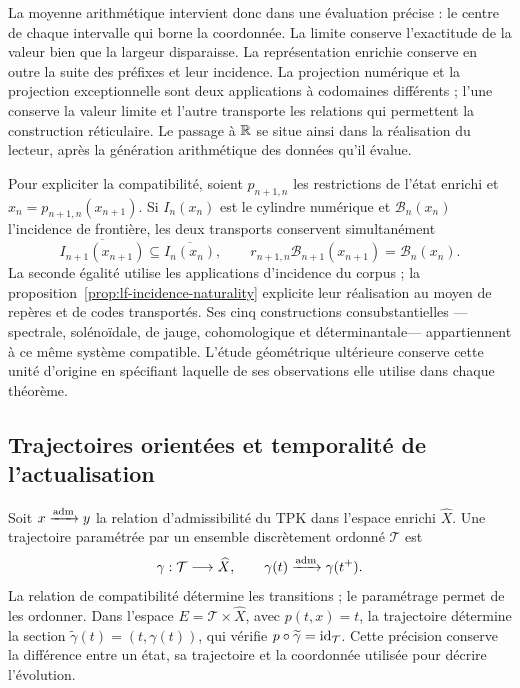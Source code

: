 La moyenne arithmétique intervient donc dans une évaluation précise : le
centre de chaque intervalle qui borne la coordonnée. La limite conserve
l’exactitude de la valeur bien que la largeur disparaisse. La représentation
enrichie conserve en outre la suite des préfixes et leur incidence.
La projection numérique et la projection exceptionnelle sont deux applications
à codomaines différents ; l’une conserve la valeur limite et l’autre transporte
les relations qui permettent la construction réticulaire. Le passage à
\(\mathbb R\) se situe ainsi dans la réalisation du lecteur, après la
génération arithmétique des données qu’il évalue.

Pour expliciter la compatibilité, soient \(p_{n+1,n}\) les restrictions de l'état enrichi et \(x_n=p_{n+1,n}(x_{n+1})\). Si \(I_n(x_n)\) est le cylindre numérique et \(\mathcal B_n(x_n)\) l'incidence de frontière, les deux transports conservent simultanément
\[
 \overline{I_{n+1}(x_{n+1})}\subseteq\overline{I_n(x_n)},\qquad
 r_{n+1,n}\mathcal B_{n+1}(x_{n+1})=\mathcal B_n(x_n).
\]
La seconde égalité utilise les applications d'incidence du corpus ; la proposition~\ref{prop:lf-incidence-naturality} explicite leur réalisation au moyen de repères et de codes transportés. Ses cinq constructions consubstantielles ---spectrale, solénoïdale, de jauge, cohomologique et déterminantale--- appartiennent à ce même système compatible. L'étude géométrique ultérieure conserve cette unité d'origine en spécifiant laquelle de ses observations elle utilise dans chaque théorème.

\subsection{Trajectoires orientées et temporalité de l’actualisation}

Soit \(x\xrightarrow{\rm adm}y\) la relation d’admissibilité du TPK dans
l’espace enrichi \(\widehat X\). Une trajectoire paramétrée par
un ensemble discrètement ordonné \(\mathcal T\) est
\[
 \gamma:\mathcal T\longrightarrow\widehat X,
 \qquad\gamma(t)\xrightarrow{\rm adm}\gamma(t^+).
\]
La relation de compatibilité détermine les transitions ; le paramétrage
permet de les ordonner. Dans l’espace \(E=\mathcal T\times\widehat X\),
avec \(p(t,x)=t\), la trajectoire détermine la section
\(\widetilde\gamma(t)=(t,\gamma(t))\), qui vérifie
\(p\circ\widetilde\gamma=\operatorname{id}_{\mathcal T}\).
Cette précision conserve la différence entre un état, sa trajectoire et
la coordonnée utilisée pour décrire l’évolution.

